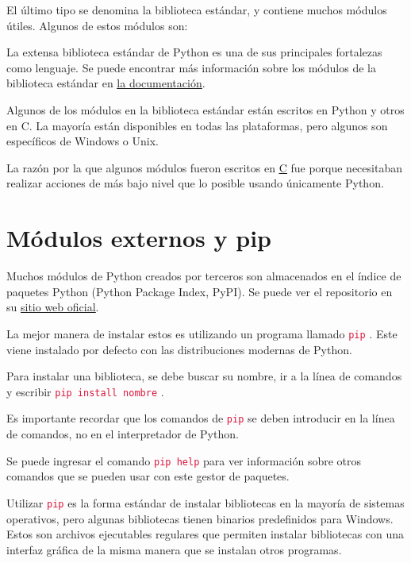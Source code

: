 \documentclass{report}
\newcommand{\link}[2]{\href{#1}{\underline{#2}}}
\newcommand{\ttt}[1]{
  \textcolor{Crimson}{\texttt{#1}}
}
\begin{document}
El último tipo se denomina la biblioteca estándar, y contiene muchos módulos útiles. Algunos de estos módulos son:


La extensa biblioteca estándar de Python es una de sus principales fortalezas como lenguaje. Se puede encontrar más información sobre los módulos de la biblioteca estándar en \link{https://docs.python.org/3/library/index.html}{la documentación}.\smallskip

Algunos de los módulos en la biblioteca estándar están escritos en Python y otros en C. La mayoría están disponibles en todas las plataformas, pero algunos son específicos de Windows o Unix.\smallskip

La razón por la que algunos módulos fueron escritos en \link{https://es.wikipedia.org/wiki/C_(lenguaje_de_programaci\%C3\%B3n)}{C} fue porque necesitaban realizar acciones de más bajo nivel que lo posible usando únicamente Python.

\section{Módulos externos y pip}

Muchos módulos de Python creados por terceros son almacenados en el índice de paquetes Python (Python Package Index, PyPI). Se puede ver el repositorio en su \link{https://pypi.org}{sitio web oficial}.\smallskip

La mejor manera de instalar estos es utilizando un programa llamado \ttt{pip}. Este viene instalado por defecto con las distribuciones modernas de Python.\smallskip

Para instalar una biblioteca, se debe buscar su nombre, ir a la línea de comandos y escribir \ttt{pip install nombre}.


Es importante recordar que los comandos de \ttt{pip} se deben introducir en la línea de comandos, no en el interpretador de Python.\smallskip

Se puede ingresar el comando \ttt{pip help} para ver información sobre otros comandos que se pueden usar con este gestor de paquetes.


Utilizar \ttt{pip} es la forma estándar de instalar bibliotecas en la mayoría de sistemas operativos, pero algunas bibliotecas tienen binarios predefinidos para Windows. Estos son archivos ejecutables regulares que permiten instalar bibliotecas con una interfaz gráfica de la misma manera que se instalan otros programas.
\end{document}
